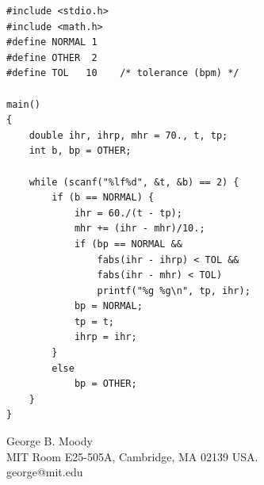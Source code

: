 \documentclass[twocolumn]{cinc}
\begin{document}
{\small
\begin{verbatim}
#include <stdio.h>
#include <math.h>
#define NORMAL 1
#define OTHER  2
#define TOL   10    /* tolerance (bpm) */

main()
{
    double ihr, ihrp, mhr = 70., t, tp;
    int b, bp = OTHER;

    while (scanf("%lf%d", &t, &b) == 2) {
        if (b == NORMAL) {
            ihr = 60./(t - tp);
            mhr += (ihr - mhr)/10.;
            if (bp == NORMAL &&
                fabs(ihr - ihrp) < TOL &&
                fabs(ihr - mhr) < TOL)
                printf("%g %g\n", tp, ihr);
            bp = NORMAL;
            tp = t;
            ihrp = ihr;
        }
        else
            bp = OTHER;
    }
}
\end{verbatim}
}

\vspace*{-.6cm} %
\begin{correspondence}
George B. Moody\\
MIT Room E25-505A, Cambridge, MA 02139 USA.\\
george@mit.edu
\end{correspondence}
\end{document}
